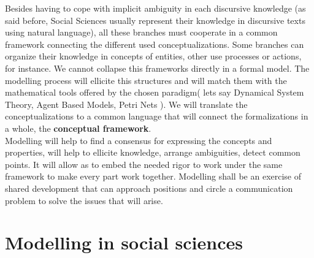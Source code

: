 \documentclass[11pt,oneside,a4paper,openright]{report}
\begin{document}
Besides having to cope with implicit ambiguity in each discursive knowledge (as said before, Social Sciences usually represent their knowledge in discursive texts using natural language), all these branches must cooperate in a common framework connecting the different used conceptualizations. Some branches can organize their knowledge in concepts of entities, other use processes or actions, for instance. We cannot collapse this frameworks directly in a formal model. The modelling process will ellicite this structures and will match them with the mathematical tools offered by the chosen paradigm( lets say Dynamical System Theory, Agent Based Models, Petri Nets ). We will translate the conceptualizations to a common language that will connect the formalizations in a whole, the \textbf{conceptual framework}.\\
Modelling will help to find a consensus for expressing the concepts and properties, will help to ellicite knowledge, arrange ambiguities, detect common points. It will allow as to embed the needed rigor to work under the same framework to make every part work together. Modelling shall be an exercise of shared development that can approach positions and circle a communication problem to solve the issues that will arise.\\



\section{Modelling in social sciences}
\label{sec:modelsinSC}


\end{document}
